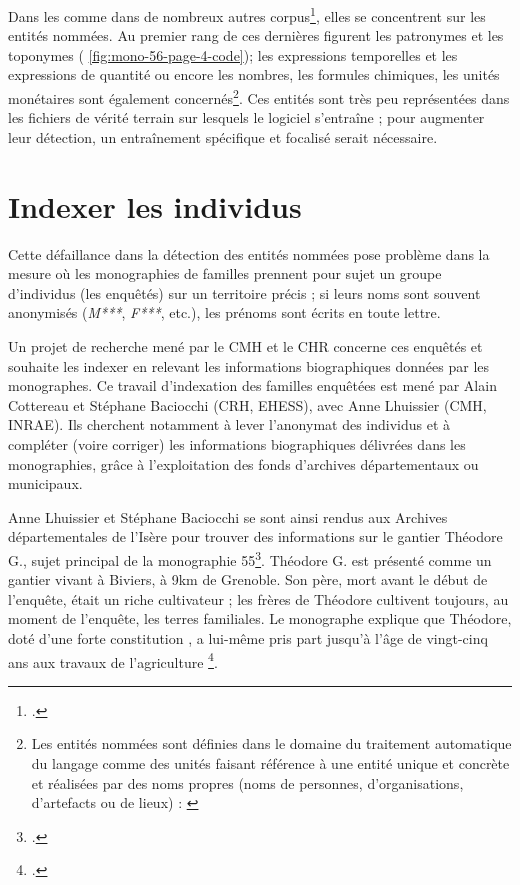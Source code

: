 Dans les \odm{} comme dans de nombreux autres corpus\footcite[p. 1]{sagot}, elles se concentrent sur les entités nommées. Au premier rang de ces dernières figurent les patronymes et les toponymes (\fig{} \ref{fig:mono-56-page-4-code}); les \og expressions temporelles et les expressions de quantité \fg{} ou encore \og les nombres, les formules chimiques, les unités monétaires \fg{} sont également concernés\footnote{Les entités nommées sont définies dans le domaine du traitement automatique du langage comme des \og unités faisant référence à une entité unique et concrète et réalisées par des noms propres (noms de personnes, d’organisations, d’artefacts ou de lieux) \fg{} : \cite[p. 4]{sagot}}. Ces entités sont très peu représentées dans les fichiers de vérité terrain sur lesquels le logiciel s'entraîne ; pour augmenter leur détection, un entraînement spécifique et focalisé serait nécessaire.

\section{Indexer les individus}


Cette défaillance dans la détection des entités nommées pose problème dans la mesure où les monographies de familles prennent pour sujet un groupe d'individus (les enquêtés) sur un territoire précis ; si leurs noms sont souvent anonymisés (\textit{M***}, \textit{F***}, etc.), les prénoms sont écrits en toute lettre.

Un projet de recherche mené par le CMH et le CHR concerne ces enquêtés et souhaite les indexer en relevant les informations biographiques données par les monographes. Ce travail d'indexation des familles enquêtées est mené par Alain Cottereau et Stéphane Baciocchi (CRH, EHESS), avec Anne Lhuissier (CMH, INRAE). Ils  cherchent notamment à lever l'anonymat  des individus et à compléter (voire corriger) les informations biographiques délivrées dans les monographies, grâce à l'exploitation des fonds d'archives départementaux ou municipaux.

Anne Lhuissier et Stéphane Baciocchi se sont ainsi rendus aux Archives départementales de l'Isère pour trouver des informations sur le gantier Théodore  G., sujet principal de la monographie \no{}55\footcite{mono055a}. Théodore  G. est présenté comme un gantier vivant à Biviers, à 9km de Grenoble. Son père, mort avant le début de l'enquête, était un riche cultivateur ; les frères de Théodore cultivent toujours, au moment de l'enquête, les terres familiales. Le monographe explique que Théodore, doté \og d'une forte constitution \fg{}, a lui-même \og pris part jusqu'à l'âge de vingt-cinq ans aux travaux de l'agriculture \fg{}\footcite[p. 471]{mono055a}.

